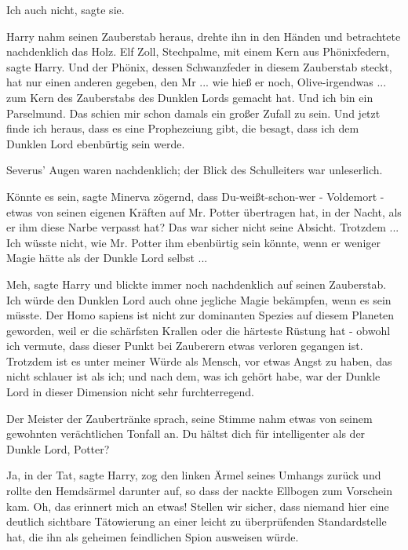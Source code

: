 \glqq{}Ich auch nicht\grqq{}, sagte sie.

Harry nahm seinen Zauberstab heraus, drehte ihn in den Händen und betrachtete
nachdenklich das Holz. \glqq{}Elf Zoll, Stechpalme, mit einem Kern aus
Phönixfedern\grqq{}, sagte Harry. \glqq{}Und der Phönix, dessen Schwanzfeder in
diesem Zauberstab steckt, hat nur einen anderen gegeben, den Mr ... wie hieß er
noch, Olive-irgendwas ... zum Kern des Zauberstabs des Dunklen Lords gemacht hat.
Und ich bin ein Parselmund. Das schien mir schon damals ein großer Zufall zu
sein. Und jetzt finde ich heraus, dass es eine Prophezeiung gibt, die besagt,
dass ich dem Dunklen Lord ebenbürtig sein werde.\grqq{}

Severus' Augen waren nachdenklich; der Blick des Schulleiters war unleserlich.

\glqq{}Könnte es sein\grqq{}, sagte Minerva zögernd, \glqq{}dass
Du-weißt-schon-wer - Voldemort - etwas von seinen eigenen Kräften auf Mr. Potter
übertragen hat, in der Nacht, als er ihm diese Narbe verpasst hat? Das war
sicher nicht seine Absicht. Trotzdem ... Ich wüsste nicht, wie Mr. Potter ihm
ebenbürtig sein könnte, wenn er weniger Magie hätte als der Dunkle Lord
selbst ...\grqq{}

\glqq{}Meh\grqq{}, sagte Harry und blickte immer noch nachdenklich auf seinen
Zauberstab. \glqq{}Ich würde den Dunklen Lord auch ohne jegliche Magie bekämpfen,
wenn es sein müsste. Der Homo sapiens ist nicht zur dominanten Spezies auf
diesem Planeten geworden, weil er die schärfsten Krallen oder die härteste
Rüstung hat - obwohl ich vermute, dass dieser Punkt bei Zauberern etwas verloren
gegangen ist. Trotzdem ist es unter meiner Würde als Mensch, vor etwas Angst zu
haben, das nicht schlauer ist als ich; und nach dem, was ich gehört habe, war
der Dunkle Lord in dieser Dimension nicht sehr furchterregend.\grqq{}

Der Meister der Zaubertränke sprach, seine Stimme nahm etwas von seinem
gewohnten verächtlichen Tonfall an. \glqq{}Du hältst dich für intelligenter als
der Dunkle Lord, Potter?\grqq{}

\glqq{}Ja, in der Tat\grqq{}, sagte Harry, zog den linken Ärmel seines Umhangs
zurück und rollte den Hemdsärmel darunter auf, so dass der nackte Ellbogen zum
Vorschein kam. \glqq{}Oh, das erinnert mich an etwas! Stellen wir sicher, dass
niemand hier eine deutlich sichtbare Tätowierung an einer leicht zu
überprüfenden Standardstelle hat, die ihn als geheimen feindlichen Spion
ausweisen würde.\grqq{}

